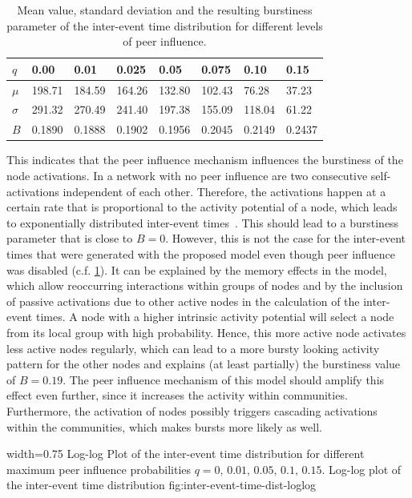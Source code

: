 \begin{table}
\centering
\begin{tabular}{llllllll}
\( q \) & 0.00 & 0.01 & 0.025 & 0.05 & 0.075 & 0.10 & 0.15 \\ \hline
\( \mu \) & 198.71 & 184.59 & 164.26 & 132.80 & 102.43 & 76.28 & 37.23 \\ \hline
\( \sigma \) & 291.32 & 270.49 & 241.40 & 197.38 & 155.09 & 118.04 & 61.22 \\ \hline
\( B \) & 0.1890 & 0.1888 & 0.1902 & 0.1956 & 0.2045 & 0.2149 & 0.2437
\end{tabular}

\caption[Burstiness of inter-event time distributions]{Mean value, standard deviation and the resulting burstiness parameter of the inter-event time distribution for different levels of peer influence.}
\label{tbl:burstiness-parameter}
\end{table}


This indicates that the peer influence mechanism influences the burstiness of the node activations.
In a network with no peer influence are two consecutive self-activations independent of each other.
Therefore, the activations happen at a certain rate that is proportional to the activity potential of a node, which leads to exponentially distributed inter-event times~\cite{Moinet2016}.
This should lead to a burstiness parameter that is close to \( B = 0 \).
However, this is not the case for the inter-event times that were generated with the proposed model even though peer influence was disabled (c.f. \cref{tbl:burstiness-parameter}).
It can be explained by the memory effects in the model, which allow reoccurring interactions within groups of nodes and by the inclusion of passive activations due to other active nodes in the calculation of the inter-event times.
A node with a higher intrinsic activity potential will select a node from its local group with high probability.
Hence, this more active node activates less active nodes regularly, which can lead to a more bursty looking activity pattern for the other nodes and explains (at least partially) the burstiness value of \( B = 0.19 \).
The peer influence mechanism of this model should amplify this effect even further, since it increases the activity within communities.
Furthermore, the activation of nodes possibly triggers cascading activations within the communities, which makes bursts more likely as well.


      {width=0.75\textwidth}
      {Log-log Plot of the inter-event time distribution for different maximum peer influence probabilities \( q = 0, \, 0.01, \, 0.05, \, 0.1, \, 0.15\).}
      {Log-log plot of the inter-event time distribution}
      {fig:inter-event-time-dist-loglog}


